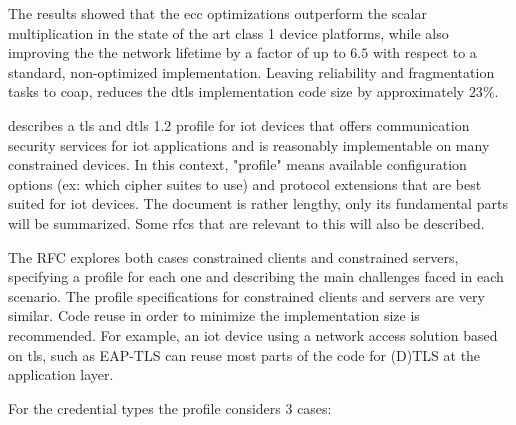 \documentclass{llncs}
\begin{document}
The results showed that the \gls{ecc} optimizations
outperform the scalar multiplication in the state of the art class 1 device platforms,
while also improving the the network lifetime by a factor of up to $6.5$ with
respect to a standard, non-optimized implementation. Leaving reliability and
fragmentation tasks to \gls{coap}, reduces the \gls{dtls} implementation code size
by approximately $23\%$.

\cite{RFC7925} describes a \gls{tls} and \gls{dtls} 1.2
profile for \gls{iot} devices that offers communication security services
for \gls{iot} applications and is reasonably implementable on many constrained devices.
In this context, "profile" means available configuration options (ex: which
cipher suites to use) and protocol extensions that are best suited for \gls{iot} devices.
The document is rather lengthy, only its fundamental parts will be summarized. Some \gls{rfc}s that are relevant to this will also be described.

The RFC explores both cases constrained clients and constrained servers, specifying
a profile for each one and describing the main challenges faced in each scenario.
The profile specifications for constrained clients and servers are very similar.
Code reuse in order to minimize the implementation size is recommended. For example, an \gls{iot} device
using a network access solution based on \gls{tls}, such as EAP-TLS\cite{rfc5216}
can reuse most parts of the code for (D)TLS at the application layer.

For the credential types the profile considers 3 cases:
\end{document}
